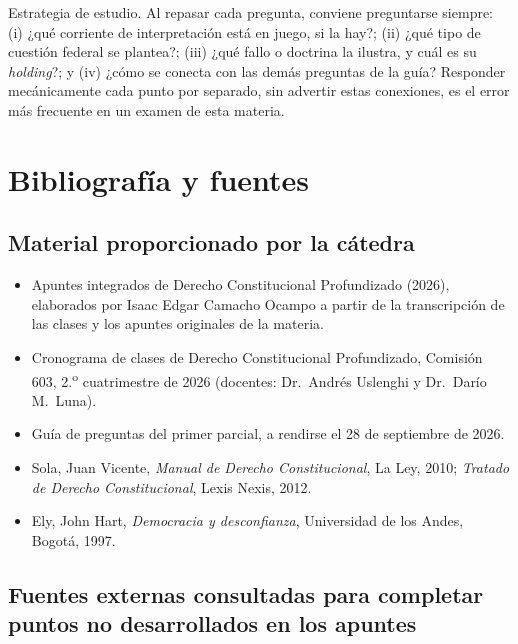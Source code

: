 \documentclass[12pt,oneside]{book}
\begin{document}
\begin{impbox}
Estrategia de estudio. Al repasar cada pregunta, conviene preguntarse siempre: (i)
¿qué corriente de interpretación está en juego, si la hay?; (ii) ¿qué tipo de
cuestión federal se plantea?; (iii) ¿qué fallo o doctrina la ilustra, y cuál es su
\textit{holding}?; y (iv) ¿cómo se conecta con las demás preguntas de la guía?
Responder mecánicamente cada punto por separado, sin advertir estas conexiones,
es el error más frecuente en un examen de esta materia.
\end{impbox}

\chapter*{Bibliografía y fuentes}

\section*{Material proporcionado por la cátedra}

\begin{itemize}[leftmargin=1.4em]
  \item Apuntes integrados de Derecho Constitucional Profundizado (2026),
  elaborados por Isaac Edgar Camacho Ocampo a partir de la transcripción de las
  clases y los apuntes originales de la materia.
  \item Cronograma de clases de Derecho Constitucional Profundizado, Comisión
  603, 2.\textsuperscript{o} cuatrimestre de 2026 (docentes: Dr.\ Andrés
  Uslenghi y Dr.\ Darío M.\ Luna).
  \item Guía de preguntas del primer parcial, a rendirse el 28 de septiembre de
  2026.
  \item Sola, Juan Vicente, \textit{Manual de Derecho Constitucional}, La Ley,
  2010; \textit{Tratado de Derecho Constitucional}, Lexis Nexis, 2012.
  \item Ely, John Hart, \textit{Democracia y desconfianza}, Universidad de los
  Andes, Bogotá, 1997.
\end{itemize}

\section*{Fuentes externas consultadas para completar puntos no desarrollados en los apuntes}
\end{document}
